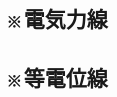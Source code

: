 \documentclass[../../ps_q.tex]{subfiles}
\begin{document}
    \vspace{2cm}
    \vfill

\subsection{※電気力線}
    

    \vspace{2cm}
    \vfill

\subsection{※等電位線}
    

    \vspace{2cm}
    \vfill
\end{document}
